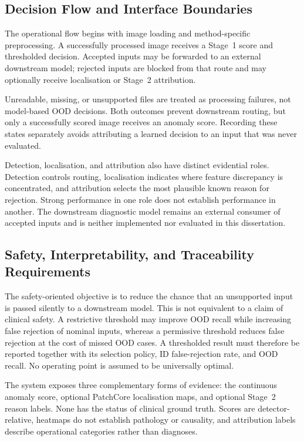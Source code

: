 \documentclass[fleqn,12pt]{olplainarticle}
\begin{document}
\subsection{Decision Flow and Interface Boundaries}
\label{subsec:decision_flow}

The operational flow begins with image loading and method-specific
preprocessing. A successfully processed image receives a Stage~1 score and
thresholded decision. Accepted inputs may be forwarded to an external
downstream model; rejected inputs are blocked from that route and may
optionally receive localisation or Stage~2 attribution.

Unreadable, missing, or unsupported files are treated as processing failures,
not model-based OOD decisions. Both outcomes prevent downstream routing, but
only a successfully scored image receives an anomaly score. Recording these
states separately avoids attributing a learned decision to an input that was
never evaluated.

Detection, localisation, and attribution also have distinct evidential roles.
Detection controls routing, localisation indicates where feature discrepancy
is concentrated, and attribution selects the most plausible known reason for
rejection. Strong performance in one role does not establish performance in
another. The downstream diagnostic model remains an external consumer of
accepted inputs and is neither implemented nor evaluated in this dissertation.

\subsection{Safety, Interpretability, and Traceability Requirements}
\label{subsec:safety_traceability}

The safety-oriented objective is to reduce the chance that an unsupported
input is passed silently to a downstream model. This is not equivalent to a
claim of clinical safety. A restrictive threshold may improve OOD recall while
increasing false rejection of nominal inputs, whereas a permissive threshold
reduces false rejection at the cost of missed OOD cases. A thresholded result
must therefore be reported together with its selection policy, ID
false-rejection rate, and OOD recall. No operating point is assumed to be
universally optimal.

The system exposes three complementary forms of evidence: the continuous
anomaly score, optional PatchCore localisation maps, and optional Stage~2
reason labels. None has the status of clinical ground truth. Scores are
detector-relative, heatmaps do not establish pathology or causality, and
attribution labels describe operational categories rather than diagnoses.
\end{document}
